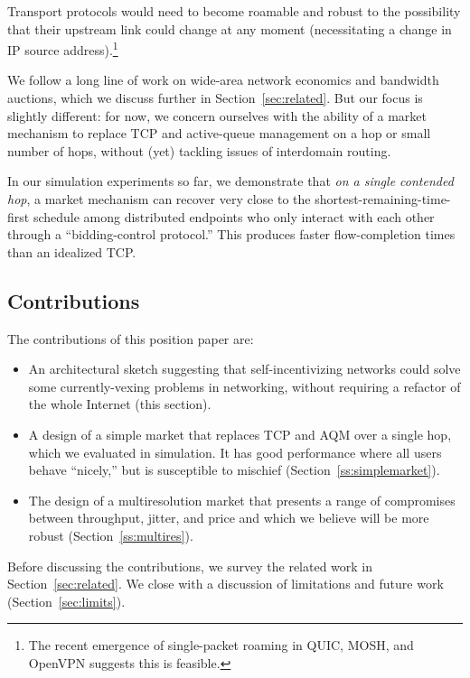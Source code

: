 Transport protocols would need to become roamable and robust to the
possibility that their upstream link could change at any moment
(necessitating a change in IP source address).\footnote{The recent
  emergence of single-packet roaming in QUIC, MOSH, and OpenVPN
  suggests this is feasible.}

We follow a long line of work on wide-area network economics and
bandwidth auctions, which we discuss further in
Section~\ref{sec:related}. But our focus is slightly different: for now, we concern ourselves
with the ability of a market mechanism to replace TCP and active-queue
management on a hop or small number of hops, without (yet) tackling
issues of interdomain routing.

In our simulation experiments so far, we demonstrate that \emph{on a
  single contended hop}, a market mechanism can recover very close to the
shortest-remaining-time-first schedule among distributed endpoints who
only interact with each other through a ``bidding-control protocol.''
This produces faster flow-completion times than an idealized TCP.

\subsection{Contributions}

The contributions of this position paper are:

\begin{itemize}

\item An architectural sketch suggesting that
  self-incentivizing networks could solve some currently-vexing problems in
  networking, without requiring a refactor of the whole Internet (this section).

\item A design of a simple market that replaces TCP and AQM over a
  single hop, which we evaluated in simulation. It has good
  performance where all users behave ``nicely,'' but is susceptible to
  mischief (Section~\ref{ss:simplemarket}).

\item The design of a multiresolution market that presents a range of
  compromises between throughput, jitter, and price and which we
  believe will be more robust (Section~\ref{ss:multires}).

\end{itemize}

Before discussing the contributions, we survey the related work in
Section~\ref{sec:related}. We close with a discussion of limitations
and future work (Section~\ref{sec:limits}).
